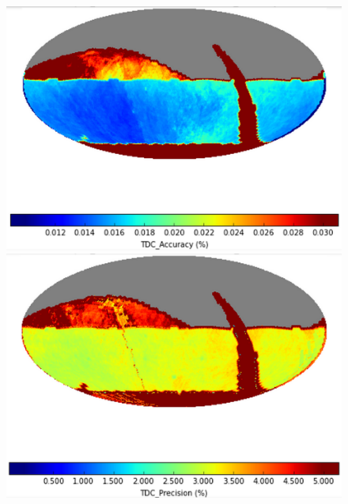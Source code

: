 \begin{figure}[!ht]
  \capstart
  \begin{minipage}[b]{\linewidth}
    \begin{minipage}[b]{0.32\linewidth}
      \centering\includegraphics[width=\linewidth]{figs/lenstimedelays-ops2_1075-Accuracy-skymap.png}
    \end{minipage} \hfill
    \begin{minipage}[b]{0.32\linewidth}
      \centering\includegraphics[width=\linewidth]{figs/lenstimedelays-ops2_1075-Precision-skymap.png}
    \end{minipage} \hfill
    \begin{minipage}[b]{0.32\linewidth}

\end{minipage}
\end{minipage}
\end{figure}
